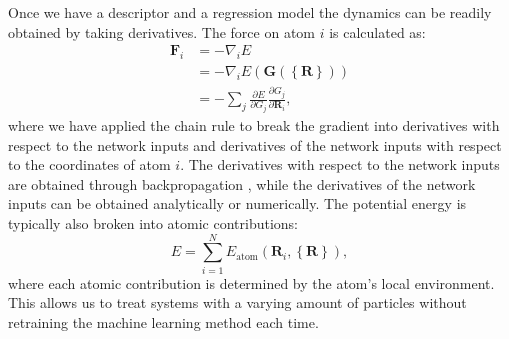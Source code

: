Once we have a descriptor and a regression model the dynamics
can be readily obtained by taking derivatives. The force on atom $i$
is calculated as:
\begin{equation}
\begin{split}
    \bm{F}_i &= -\nabla_i E \\
    &= -\nabla_i
    E(\bm{G}(\left\{\bm{R}\right\})) \\
    &= -\sum_j \frac{\partial E}
    {\partial G_j} \frac{\partial G_j}{\partial \bm{R}_i} ,
\end{split}
\end{equation}
where we have applied the chain rule to break the gradient
into derivatives with respect to the network inputs
and derivatives of the network inputs with
respect to the coordinates of atom $i$.
The derivatives with respect to the network inputs are obtained
through backpropagation \cite{rumelhart1988learning}, while
the derivatives of the network inputs can be obtained analytically
or numerically.
The potential energy is typically also broken into
atomic contributions:
\begin{equation}
E = \sum_{i=1}^N E_{\text{atom}}\left(\bm{R}_i, \left\{\bm{R}\right\} \right) ,
\end{equation}
where each atomic contribution is determined by the atom's
local environment. This allows us to treat systems with
a varying amount of particles without retraining
the machine learning method each time.

